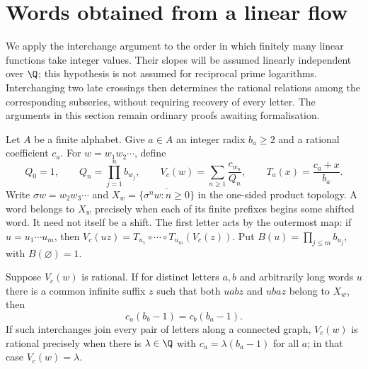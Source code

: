 \section{Words obtained from a linear flow}
\label{long269:sec:clock-transfer}

We apply the interchange argument to the order in which finitely many
linear functions take integer values. Their slopes will be assumed
linearly independent over $\Q$; this hypothesis is not assumed for
reciprocal prime logarithms. Interchanging two late crossings then
determines the rational relations among the corresponding subseries,
without requiring recovery of every letter. The arguments in this
section remain ordinary proofs awaiting formalisation.

Let $A$ be a finite alphabet.  Give $a\in A$ an integer radix $b_a\ge2$
and a rational coefficient $c_a$.  For $w=w_1w_2\cdots$, define
\[
 Q_0=1,\qquad Q_n=\prod_{j=1}^n b_{w_j},\qquad
 V_c(w)=\sum_{n\ge1}\frac{c_{w_n}}{Q_n},\qquad
 T_a(x)=\frac{c_a+x}{b_a}.
\]
Write $\sigma w=w_2w_3\cdots$ and
$X_w=\overline{\{\sigma^nw:n\ge0\}}$ in the one-sided product topology.
A word belongs to $X_w$ precisely when each of its finite prefixes begins
some shifted word. It need not itself be a shift. The first letter acts
by the outermost map: if $u=u_1\cdots u_m$, then
$V_c(uz)=T_{u_1}\circ\cdots\circ T_{u_m}(V_c(z))$.  Put
$B(u)=\prod_{j\le m}b_{u_j}$, with $B(\varnothing)=1$.

\begin{remark}
\label{long269:lem:late-swap}
Suppose $V_c(w)$ is rational.  If for distinct letters $a,b$ and arbitrarily
long words $u$ there is a common infinite suffix $z$ such that both
$uabz$ and $ubaz$ belong to $X_w$, then
\[
 c_a(b_b-1)=c_b(b_a-1).
\]
If such interchanges join every pair of letters along a connected graph,
$V_c(w)$ is rational precisely when there is $\lambda\in\Q$ with
$c_a=\lambda(b_a-1)$ for all $a$; in that case $V_c(w)=\lambda$.
\end{remark}

